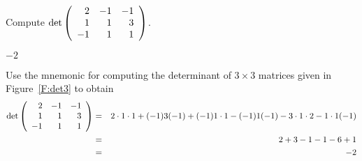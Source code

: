 \documentclass{ximera}
\author{}
\begin{document}

\begin{exercise}\label{mc.exercise8a}

Compute \quad $\det\left(\begin{array}{rrrrrrrrrrrrrrrrrr} 2 & -1 &  -1\\ 1 & 1 & 3\\ -1 & 1 &  1 \end{array}\right)$.
  
\begin{solution}

\ans \quad $-2$

\soln Use the mnemonic for computing the determinant of 
		$3\times 3$ matrices given in Figure~\ref{F:det3} to obtain 
\begin{eqnarray*}
\det\left(\begin{array}{rrrrrrrrrrrrrrrrrr} 2 & -1 &  -1\\ 1 & 1 & 3\\ -1 & 1 &  1 \end{array}\right) & =  &
2\cdot 1\cdot 1 + (-1)3(-1) + (-1) 1\cdot 1 -(-1)1(-1) -3\cdot 1\cdot 2 - 1\cdot 1(-1)\\
& = & 2 + 3 - 1 - 1 - 6 +1 \\
& = & -2
\end{eqnarray*}
\end{solution}
\end{exercise}
\end{document}
